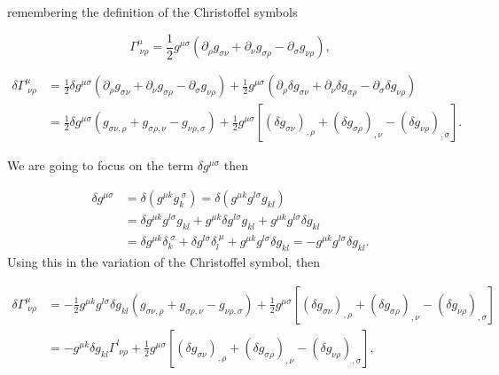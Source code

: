         remembering the definition of the Christoffel symbols

        \begin{equation}
            \Gamma^{\mu}_{\;\nu\rho} = \frac{1}{2}g^{\mu\sigma}\left(\partial_{\rho}g_{\sigma\nu} + \partial_{\nu}g_{\sigma\rho} - \partial_{\sigma}g_{\nu\rho} \right),
        \end{equation}

        \begin{align*}
            \delta\Gamma^{\mu}_{\;\nu\rho}&=\frac{1}{2}\delta g^{\mu\sigma}\left(\partial_{\rho}g_{\sigma\nu} + \partial_{\nu}g_{\sigma\rho} - \partial_{\sigma}g_{\nu\rho}  \right) + \frac{1}{2}g^{\mu\sigma}\left(\partial_{\rho}\delta g_{\sigma\nu} + \partial_{\nu}\delta g_{\sigma\rho} - \partial_{\sigma}\delta g_{\nu\rho} \right)\\
            &= \frac{1}{2}\delta g^{\mu\sigma}\left(g_{\sigma\nu , \rho} + g_{\sigma \rho ,\nu} - g_{\nu\rho , \sigma} \right) + \frac{1}{2}g^{\mu\sigma}\left[(\delta g_{\sigma\nu})_{,\rho} + (\delta g_{\sigma\rho})_{,\nu} - (\delta g_{\nu\rho})_{,\sigma} \right].
        \end{align*}

        We are going to focus on the term $\delta g^{\mu\sigma}$ then 

        \begin{align*}
            \delta g^{\mu\sigma} &= \delta \left(g^{\mu k}g_k^{\;\sigma} \right) = \delta\left(g^{\mu k}g^{l\sigma}g_{kl} \right)\\
            &= \delta g^{\mu k}g^{l\sigma}g_{kl} + g^{\mu k}\delta g^{l\sigma}g_{kl} + g^{\mu k}g^{l\sigma}\delta g_{kl}\\
            &= \delta g^{\mu k}\delta_k^{\;\sigma} + \delta g^{l\sigma}\delta_l^{\;\mu} + g^{\mu k}g^{l\sigma}\delta g_{kl} = - g^{\mu k}g^{l\sigma}\delta g_{kl}.
        \end{align*}
        Using this in the variation of the Christoffel symbol, then

        \begin{align*}
            \delta \Gamma^{\mu}_{\;\nu\rho}&=-\frac{1}{2}g^{\mu k}g^{l\sigma}\delta g_{kl} \left(g_{\sigma\nu ,\rho} + g_{\sigma \rho ,\nu} - g_{\nu\rho , \sigma} \right) + \frac{1}{2}g^{\mu\sigma}\left[(\delta g_{\sigma\nu})_{,\rho} + (\delta g_{\sigma\rho})_{,\nu} - (\delta g_{\nu\rho})_{,\sigma} \right]\\
            &= -g^{\mu k}\delta g_{kl}\Gamma^{l}_{\;\nu\rho} + \frac{1}{2}g^{\mu\sigma}\left[(\delta g_{\sigma\nu})_{,\rho} + (\delta g_{\sigma\rho})_{,\nu} - (\delta g_{\nu\rho})_{,\sigma} \right],
        \end{align*}

